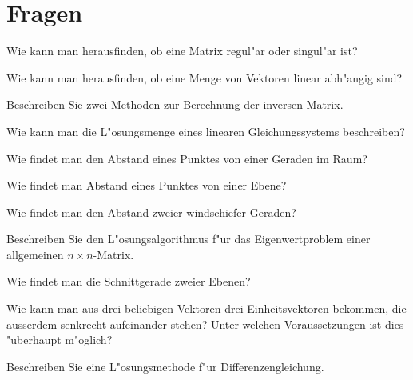 \documentclass[a4paper,12pt,twocolumn]{article}
\begin{document}
\section{Fragen}
\begin{compactenum}
\item Wie kann man herausfinden, ob eine Matrix regul"ar oder singul"ar ist?
\item Wie kann man herausfinden, ob eine Menge von Vektoren linear
abh"angig sind?
\item Beschreiben Sie zwei Methoden zur Berechnung der inversen Matrix.
\item Wie kann man die L"osungsmenge eines linearen Gleichungssystems
beschreiben?
\item Wie findet man den Abstand eines Punktes von einer Geraden im Raum?
\item Wie findet man Abstand eines Punktes von einer Ebene?
\item Wie findet man den Abstand zweier windschiefer Geraden?
\item Beschreiben Sie den L"osungsalgorithmus f"ur das Eigenwertproblem
einer allgemeinen $n\times n$-Matrix.
\item Wie findet man die Schnittgerade zweier Ebenen?
\item Wie kann man aus drei beliebigen Vektoren drei Einheitsvektoren
bekommen, die ausserdem senkrecht aufeinander stehen?
Unter welchen Voraussetzungen ist dies "uberhaupt m"oglich?
\item Beschreiben Sie eine L"osungsmethode f"ur Differenzengleichung.
\end{compactenum}
\end{document}
